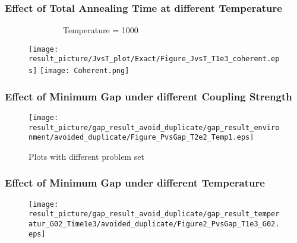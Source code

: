 \documentclass{beamer}
\begin{document}
\begin{frame}
	\frametitle{Effect of Total Annealing Time at different Temperature}
	~~~~~~~~~~~~~~Temperature = 1000~~~~~~~~~~~~~~~~~~~~
	\begin{figure}
		\centering
		\texttt{[image: result\_picture/JvsT\_plot/Exact/Figure\_JvsT\_T1e3\_coherent.eps]}
		\hfill
		\texttt{[image: Coherent.png]}\footnotemark[1]
	\end{figure}
\end{frame}

\begin{frame}
	\frametitle{Effect of Minimum Gap under different Coupling Strength }

	\begin{figure}
		\centering
		\texttt{[image: result\_picture/gap\_result\_avoid\_duplicate/gap\_result\_environment/avoided\_duplicate/Figure\_PvsGap\_T2e2\_Temp1.eps]}
		
		\caption{Plots with different problem set}
	\end{figure}
\end{frame}

\begin{frame}
	\frametitle{Effect of Minimum Gap under different Temperature }
	
	\begin{figure}
		\centering
		\texttt{[image: result\_picture/gap\_result\_avoid\_duplicate/gap\_result\_temperatur\_G02\_Time1e3/avoided\_duplicate/Figure2\_PvsGap\_T1e3\_G02.eps]}	
	\end{figure}
\end{frame}
\end{document}
